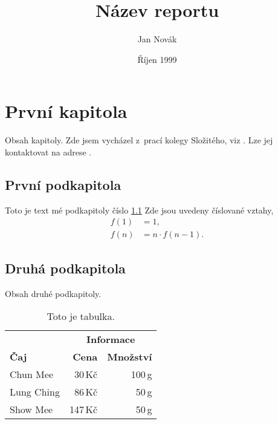 \documentclass{article}
\title{Název reportu}
\author{Jan Novák}
\date{Říjen 1999}
\begin{document}
\maketitle


\section{První kapitola}
Obsah kapitoly.
Zde jsem vycházel z~prací kolegy Složitého, viz \cite{slozi}. 
Lze jej kontaktovat na adrese .

\subsection{První podkapitola}\label{kapX}
Toto je text mé podkapitoly číslo \ref{kapX}
Zde jsou uvedeny číslované vztahy,
\begin{align}
  f(1) & = 1, \\
  f(n) & = n \cdot f(n-1).
\end{align}

\subsection{Druhá podkapitola}
Obsah druhé podkapitoly. 

\begin{table}[ht]
  \begin{center}
    \renewcommand{\arraystretch}{1.2}
    \begin{tabular}{||l|rr||}
      \hline
      & \multicolumn{2}{|c||}{\bf \hbox{Informace}} \\
      \cline{2-3}
      \bf Čaj & \bf Cena & \bf Množství \\
      \hline
      Chun Mee & 30\,Kč & 100\,g \\
      Lung Ching & 86\,Kč & 50\,g \\
      Show Mee & 147\,Kč & 50\,g \\
      \hline
    \end{tabular}
    \caption{Toto je tabulka.} \label{tab}
  \end{center}
\end{table}
\end{document}
